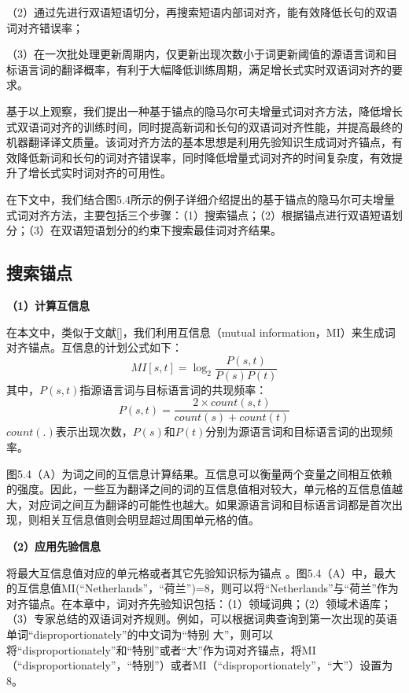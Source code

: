 （2）通过先进行双语短语切分，再搜索短语内部词对齐，能有效降低长句的双语词对齐错误率；

（3）在一次批处理更新周期内，仅更新出现次数小于词更新阈值的源语言词和目标语言词的翻译概率，有利于大幅降低训练周期，满足增长式实时双语词对齐的要求。

基于以上观察，我们提出一种基于锚点的隐马尔可夫增量式词对齐方法，降低增长式双语词对齐的训练时间，同时提高新词和长句的双语词对齐性能，并提高最终的机器翻译译文质量。该词对齐方法的基本思想是利用先验知识生成词对齐锚点，有效降低新词和长句的词对齐错误率，同时降低增量式词对齐的时间复杂度，有效提升了增长式实时词对齐的可用性。

在下文中，我们结合图5.4所示的例子详细介绍提出的基于锚点的隐马尔可夫增量式词对齐方法，主要包括三个步骤：（1）搜索锚点；（2）根据锚点进行双语短语划分；（3）在双语短语划分的约束下搜索最佳词对齐结果。

\subsection{搜索锚点}

\textbf{（1）计算互信息}

在本文中，类似于文献[\cite{Zhang:2003}]，我们利用互信息（mutual information，MI）来生成词对齐锚点。互信息的计划公式如下：
\begin{equation}
MI[s,t] = \log_2 \frac{P(s,t)}{P(s)P(t)}
\end{equation}
其中，$P(s,t)$指源语言词与目标语言词的共现频率：
\begin{equation}
P(s,t)=\frac{2\times count(s,t)}{count(s)+count(t)}
\end{equation}
$count(.)$表示出现次数，$P(s)$和$P(t)$分别为源语言词和目标语言词的出现频率。

图5.4（A）为词之间的互信息计算结果。互信息可以衡量两个变量之间相互依赖的强度。因此，一些互为翻译之间的词的互信息值相对较大，单元格的互信息值越大，对应词之间互为翻译的可能性也越大。如果源语言词和目标语言词都是首次出现，则相关互信息值则会明显超过周围单元格的值。

\textbf{（2）应用先验信息}

将最大互信息值对应的单元格或者其它先验知识标为锚点 。图5.4（A）中，最大的互信息值MI(“Netherlands”，“荷兰”)=8，则可以将“Netherlands”与“荷兰”作为对齐锚点。在本章中，词对齐先验知识包括：（1）领域词典；（2）领域术语库；（3）专家总结的双语词对齐规则。例如，可以根据词典查询到第一次出现的英语单词“disproportionately”的中文词为“特别 大”，则可以将“disproportionately”和“特别”或者“大”作为词对齐锚点，将MI（“disproportionately”，“特别”）或者MI（“disproportionately”，“大”）设置为8。

